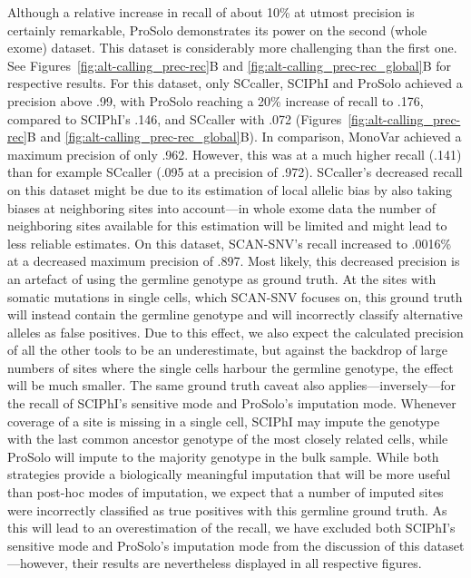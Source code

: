 \documentclass[authoryear,preprint,11pt]{scrartcl}
\begin{document}
Although a relative increase in recall of about 10\% at utmost precision is certainly remarkable, ProSolo demonstrates its power on the second (whole exome) dataset.
This dataset is considerably more challenging than the first one.
See Figures~\ref{fig:alt-calling_prec-rec}B and \ref{fig:alt-calling_prec-rec_global}B for respective results.
For this dataset, only SCcaller, SCIPhI and ProSolo achieved a precision above .99, with ProSolo reaching a 20\% increase of recall to .176, compared to SCIPhI's .146, and SCcaller with .072 (Figures~\ref{fig:alt-calling_prec-rec}B and \ref{fig:alt-calling_prec-rec_global}B).
In comparison, MonoVar achieved a maximum precision of only .962. However, this was at a much higher recall (.141) than for example SCcaller (.095 at a precision of .972).
SCcaller's decreased recall on this dataset might be due to its estimation of local allelic bias by also taking biases at neighboring sites into account---in whole exome data the number of neighboring sites available for this estimation will be limited and might lead to less reliable estimates.
On this dataset, SCAN-SNV's recall increased to .0016\% at a decreased maximum precision of .897.
Most likely, this decreased precision is an artefact of using the germline genotype as ground truth.
At the sites with somatic mutations in single cells, which SCAN-SNV focuses on, this ground truth will instead contain the germline genotype and will incorrectly classify alternative alleles as false positives.
Due to this effect, we also expect the calculated precision of all the other tools to be an underestimate, but against the backdrop of large numbers of sites where the single cells harbour the germline genotype, the effect will be much smaller.
The same ground truth caveat also applies---inversely---for the recall of SCIPhI's sensitive mode and ProSolo's imputation mode.
Whenever coverage of a site is missing in a single cell, SCIPhI may impute the genotype with the last common ancestor genotype of the most closely related cells, while ProSolo will impute to the majority genotype in the bulk sample.
While both strategies provide a biologically meaningful imputation that will be more useful than post-hoc modes of imputation, we expect that a number of imputed sites were incorrectly classified as true positives with this germline ground truth.
As this will lead to an overestimation of the recall, we have excluded both SCIPhI's sensitive mode and ProSolo's imputation mode from the discussion of this dataset---however, their results are nevertheless displayed in all respective figures.
\end{document}
